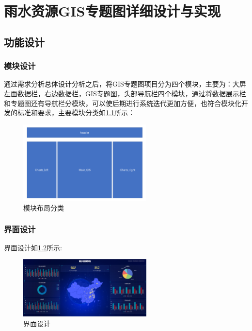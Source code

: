 
\chapter{雨水资源GIS专题图详细设计与实现}

\section{功能设计}


\subsection{模块设计}
通过需求分析总体设计分析之后，将GIS专题图项目分为四个模块，主要为：大屏左面数据栏，右边数据栏，GIS专题图，头部导航栏四个模块，通过将数据展示栏和专题图还有导航栏分模块，可以使后期进行系统迭代更加方便，也符合模块化开发的标准和要求，主要模块分类如\ref{fig:module}所示：

\begin{figure}[!htb]%
	\centering
	\includegraphics[width=0.60\textwidth]{figs/main.png}
	\caption{模块布局分类}
	\label{fig:module}
\end{figure}

\subsection{界面设计}
界面设计如\ref{fig:jiemian}所示:

\begin{figure}[!htb]%
	\centering
	\includegraphics[width=0.60\textwidth]{figs/jiemian.png}
	\caption{界面设计}
	\label{fig:jiemian}
\end{figure}
